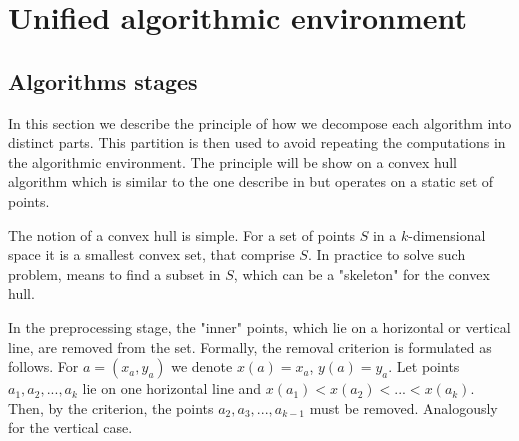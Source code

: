 \documentclass[a4paper,english,numberwithinsect,notab]{eurocg20-submission}
\begin{document}


\section{Unified algorithmic environment}
\label{sec:unified-algorithmic-environment}
\subsection{Algorithms stages}


	
	
	In this section we describe the principle of how we decompose each algorithm into distinct parts. This partition is then used to avoid repeating the computations in the algorithmic environment. The principle will be show on a convex hull algorithm which is similar to the one describe in \cite{overmars} but operates on a static set of points.
	
	The notion of a convex hull is simple. For a set of points $S$ in a $k$-dimensional space it is a smallest convex set, that comprise $S$. In practice to solve such problem, means to find a subset in $S$, which can be a "skeleton" for the convex hull.
	
	
	
	
	In the preprocessing stage, the "inner" points, which lie on a horizontal or vertical line, are removed from the set. Formally, the removal criterion is formulated as follows. For $a = (x_a, y_a)$ we denote $x(a)=x_a$, $y(a)=y_a$. Let points $a_1, a_2, ..., a_k$ lie on one horizontal line and $x(a_1) < x(a_2) <... <x (a_k) $. Then, by the criterion, the points $a_2, a_3, ..., a_{k-1}$ must be removed. Analogously for the vertical case.
	
\end{document}
